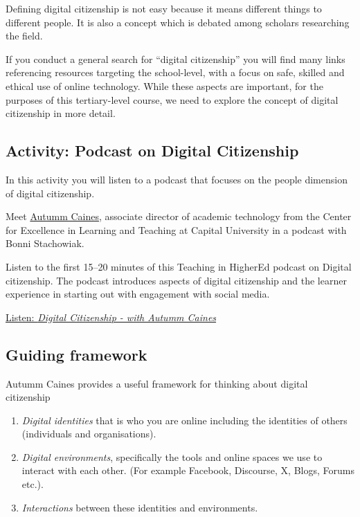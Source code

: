 \documentclass[
]{book}
\providecommand{\tightlist}{%
  \setlength{\itemsep}{0pt}\setlength{\parskip}{0pt}}
\theoremstyle{definition}
\theoremstyle{definition}
\theoremstyle{definition}
\theoremstyle{definition}
\theoremstyle{remark}
\begin{document}
Defining digital citizenship is not easy because it means different things to different people. It is also a concept which is debated among scholars researching the field.

If you conduct a general search for ``digital citizenship'' you will find many links referencing resources targeting the school-level, with a focus on safe, skilled and ethical use of online technology. While these aspects are important, for the purposes of this tertiary-level course, we need to explore the concept of digital citizenship in more detail.

\hypertarget{activity-podcast-on-digital-citizenship}{%
\subsection*{Activity: Podcast on Digital Citizenship}\label{activity-podcast-on-digital-citizenship}}

\begin{reflect}
In this activity you will listen to a podcast that focuses on the people dimension of digital citizenship.

Meet \href{http://autummcaines.com/}{Autumm Caines}, associate director of academic technology from the Center for Excellence in Learning and Teaching at Capital University in a podcast with Bonni Stachowiak.

Listen to the first 15--20 minutes of this Teaching in HigherEd podcast on Digital citizenship. The podcast introduces aspects of digital citizenship and the learner experience in starting out with engagement with social media.

\href{https://teachinginhighered.com/115}{Listen: \emph{Digital Citizenship - with Autumm Caines}}
\end{reflect}

\hypertarget{guiding-framework}{%
\subsection*{Guiding framework}\label{guiding-framework}}

Autumm Caines provides a useful framework for thinking about digital citizenship

\begin{enumerate}
\def\labelenumi{\arabic{enumi}.}
\tightlist
\item
  \emph{Digital identities} that is who you are online including the identities of others (individuals and organisations).\\
\item
  \emph{Digital environments}, specifically the tools and online spaces we use to interact with each other. (For example Facebook, Discourse, X, Blogs, Forums etc.).\\
\item
  \emph{Interactions} between these identities and environments.
\end{enumerate}
\end{document}
